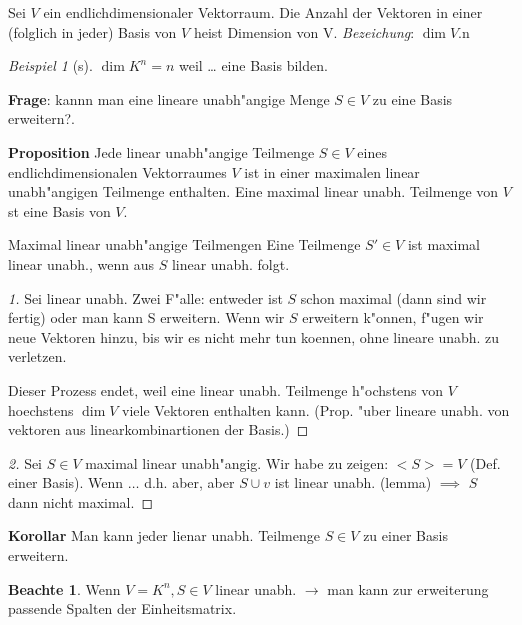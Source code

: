 \documentclass[11pt]{article}
\theoremstyle{remark}
\newtheorem{exa}{Beispiel}[section]
\theoremstyle{definition}
\newtheorem*{notte}{Beachte}
\theoremstyle{remark}
\begin{document}
\begin{definition}{}{}
Sei \(V\) ein endlichdimensionaler Vektorraum. Die Anzahl der Vektoren in einer
(folglich in jeder) Basis von \(V\) heist Dimension von V. \emph{Bezeichung}: \(\dim V\).n
\end{definition}

\begin{exa}[s] \label{}
\(\dim K^{n}=n\) weil \ldots{} eine Basis bilden. 
\end{exa}

\textbf{Frage}: kannn man eine lineare unabh"angige Menge \(S\in V\) zu eine Basis
erweitern?.

\textbf{Proposition} Jede linear unabh"angige Teilmenge \(S\in V\) eines
endlichdimensionalen Vektorraumes \(V\) ist in einer maximalen linear
unabh"angigen Teilmenge enthalten. Eine maximal linear unabh. Teilmenge von \(V\)
st eine Basis von \(V\).

\begin{definition}{Maximal linear unabh"angige Teilmengen}{}
Eine Teilmenge \(S'\in V\) ist maximal linear unabh., wenn aus \(S\)
linear unabh. folgt.
\end{definition}

\begin{proof}[1] \label{}
Sei linear unabh.
Zwei F"alle: entweder ist \(S\) schon maximal (dann sind wir fertig) oder man kann
S erweitern. Wenn wir \(S\) erweitern k"onnen, f"ugen wir neue Vektoren hinzu, bis
wir es nicht mehr tun koennen, ohne lineare unabh. zu verletzen.

Dieser Prozess endet, weil eine linear unabh. Teilmenge h"ochstens von \(V\)
hoechstens \(\dim V\) viele Vektoren enthalten kann. (Prop. "uber lineare unabh.
von vektoren aus linearkombinartionen der Basis.)
\end{proof}

\begin{proof}[2] \label{}
Sei \(S\in V\) maximal linear unabh"angig. Wir habe zu zeigen: \(<S>=V\) (Def. einer
Basis). Wenn $\ldots{}$ d.h. aber, aber \(S\cup {v}\) ist linear unabh. (lemma) $\implies$
\(S\) dann nicht maximal.
\end{proof}

\textbf{Korollar} Man kann jeder lienar unabh. Teilmenge \(S\in V\) zu einer Basis
erweitern.

\begin{notte}
Wenn \(V=K^n, S\in V\) linear unabh. \(\rightarrow\) man kann zur erweiterung passende
Spalten der Einheitsmatrix.
\end{notte}
\end{document}
